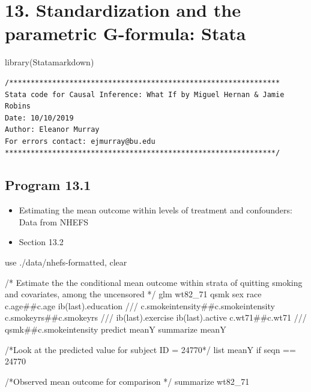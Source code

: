 \documentclass[
  10pt,
  a4paper,
]{book}
\newenvironment{Shaded}{\begin{snugshade}}{\end{snugshade}}
\newcommand{\CommentTok}[1]{\textcolor[rgb]{0.37,0.37,0.37}{#1}}
\newcommand{\FunctionTok}[1]{\textcolor[rgb]{0.28,0.35,0.67}{#1}}
\newcommand{\KeywordTok}[1]{\textcolor[rgb]{0.00,0.46,0.62}{#1}}
\newcommand{\NormalTok}[1]{\textcolor[rgb]{0.00,0.46,0.62}{#1}}
\newcommand{\OtherTok}[1]{\textcolor[rgb]{0.00,0.46,0.62}{#1}}
\providecommand{\tightlist}{%
  \setlength{\itemsep}{0pt}\setlength{\parskip}{0pt}}
\begin{document}
\chapter*{13. Standardization and the parametric G-formula: Stata}\label{standardization-and-the-parametric-g-formula-stata}

\begin{Shaded}
\begin{Highlighting}[]
\FunctionTok{library}\NormalTok{(Statamarkdown)}
\end{Highlighting}
\end{Shaded}

\begin{verbatim}
/***************************************************************
Stata code for Causal Inference: What If by Miguel Hernan & Jamie Robins
Date: 10/10/2019
Author: Eleanor Murray 
For errors contact: ejmurray@bu.edu
***************************************************************/
\end{verbatim}

\section{Program 13.1}\label{program-13.1-1}

\begin{itemize}
\tightlist
\item
  Estimating the mean outcome within levels of treatment and confounders: Data from NHEFS
\item
  Section 13.2
\end{itemize}

\begin{Shaded}
\begin{Highlighting}[]
\KeywordTok{use}\NormalTok{ ./}\KeywordTok{data}\NormalTok{/nhefs{-}formatted, }\KeywordTok{clear}

\CommentTok{/* Estimate the the conditional mean outcome within strata of quitting }
\CommentTok{smoking and covariates, among the uncensored */}
\KeywordTok{glm}\NormalTok{ wt82\_71 qsmk sex race c.age\#\#c.age ib(}\FunctionTok{last}\NormalTok{).education }\CommentTok{///}
\NormalTok{  c.smokeintensity\#\#c.smokeintensity c.smokeyrs\#\#c.smokeyrs }\CommentTok{///}
\NormalTok{  ib(}\FunctionTok{last}\NormalTok{).exercise ib(}\FunctionTok{last}\NormalTok{).active c.wt71\#\#c.wt71 }\CommentTok{///}
\NormalTok{  qsmk\#\#c.smokeintensity}
\KeywordTok{predict}\NormalTok{ meanY}
\KeywordTok{summarize}\NormalTok{ meanY}

\CommentTok{/*Look at the predicted value for subject ID = 24770*/}
\OtherTok{list}\NormalTok{ meanY }\KeywordTok{if}\NormalTok{ seqn == 24770}

\CommentTok{/*Observed mean outcome for comparison */}
\KeywordTok{summarize}\NormalTok{ wt82\_71}
\end{Highlighting}
\end{Shaded}
\end{document}
